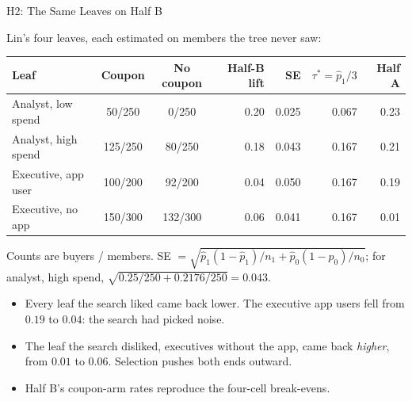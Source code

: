 \documentclass[aspectratio=169, 11pt, handout]{beamer}
\begin{document}
\begin{frame}{H2: The Same Leaves on Half B}

Lin's four leaves, each estimated on members the tree never saw:

\begin{center}
\small
\begin{tabular}{lccrrrr}
\toprule
\textbf{Leaf} & \textbf{Coupon} & \textbf{No coupon} & \textbf{Half-B lift} & \textbf{SE} & $\tau^\ast = \hat p_1/3$ & \textbf{Half A} \\
\midrule
Analyst, low spend & 50/250 & 0/250 & 0.20 & 0.025 & 0.067 & 0.23 \\
Analyst, high spend & 125/250 & 80/250 & 0.18 & 0.043 & 0.167 & 0.21 \\
Executive, app user & 100/200 & 92/200 & 0.04 & 0.050 & 0.167 & 0.19 \\
Executive, no app & 150/300 & 132/300 & 0.06 & 0.041 & 0.167 & 0.01 \\
\bottomrule
\end{tabular}
\end{center}

\small Counts are buyers / members. SE $= \sqrt{\hat p_1(1-\hat p_1)/n_1 + \hat p_0(1-\hat p_0)/n_0}$; for analyst, high spend, $\sqrt{0.25/250 + 0.2176/250} = 0.043$.

\normalsize
\bigskip

\begin{itemize}
  \item Every leaf the search liked came back lower. The executive app users fell from $0.19$ to $0.04$: the search had picked noise.
  \item The leaf the search disliked, executives without the app, came back \emph{higher}, from $0.01$ to $0.06$. Selection pushes both ends outward.
  \item Half B's coupon-arm rates reproduce the four-cell break-evens.
\end{itemize}
\end{frame}
\end{document}
